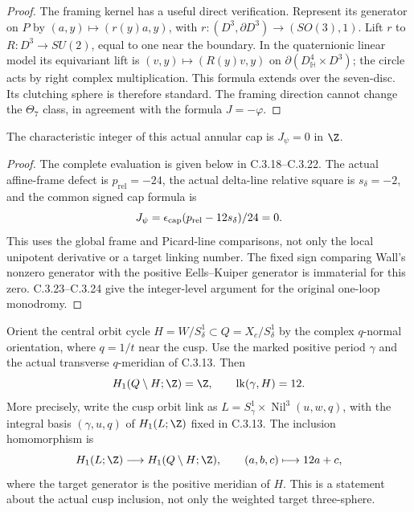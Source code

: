 \begin{proof}
The framing kernel has a useful direct verification. Represent
its generator on $P$ by
$(a,y)\mapsto(r(y)a,y)$, with
$r:(D^3,\partial D^3)\to(SO(3),1)$. Lift $r$ to
$R:D^3\to SU(2)$, equal to one near the boundary. In the
quaternionic linear model its equivariant lift is
$(v,y)\mapsto(R(y)v,y)$ on
$\partial(D^4_{\mathbb H}\times D^3)$; the circle acts by
right complex multiplication. This formula extends over the
seven-disc. Its clutching sphere is therefore standard.
The framing direction cannot change the $\Theta_7$ class,
in agreement with the formula $J=-\varphi$.
\end{proof}

\begin{corollary}
The characteristic integer of this actual annular cap is
$J_\psi=0$ in $\Z$.
\end{corollary}
\begin{proof}
The complete evaluation is given below in C.3.18--C.3.22.
The actual affine-frame defect is $p_{\mathrm{rel}}=-24$,
the actual delta-line relative square is $s_\delta=-2$, and
the common signed cap formula is
\[
 J_\psi=\epsilon_{\rm cap}
              (p_{\mathrm{rel}}-12s_\delta)/24=0.
\]
This uses the global frame and Picard-line comparisons, not
only the local unipotent derivative or a target linking number.
The fixed sign comparing Wall's nonzero generator with the
positive Eells--Kuiper generator is immaterial for this zero.
C.3.23--C.3.24 give the integer-level argument for the original
one-loop monodromy.
\end{proof}
\begin{proposition}
Orient the central orbit cycle $H=W/S^1_\delta\subset Q=X_c/S^1_\delta$
by the complex $q$-normal orientation, where $q=1/t$ near the cusp.
Use the marked positive period $\gamma$ and the actual transverse
$q$-meridian of C.3.13. Then
\[
 H_1(Q\setminus H;\Z)=\Z,
 \qquad \operatorname{lk}(\gamma,H)=12.
\]
More precisely, write the cusp orbit link as
$L=S^1_\gamma\times\operatorname{Nil}^3(u,w,q)$, with the integral
basis $(\gamma,u,q)$ of $H_1(L;\Z)$ fixed in C.3.13. The inclusion
homomorphism is
\[
 H_1(L;\Z)\longrightarrow H_1(Q\setminus H;\Z),
 \qquad (a,b,c)\longmapsto 12a+c,
\]
where the target generator is the positive meridian of $H$.
This is a statement about the actual cusp inclusion, not only the
weighted target three-sphere.
\end{proposition}
